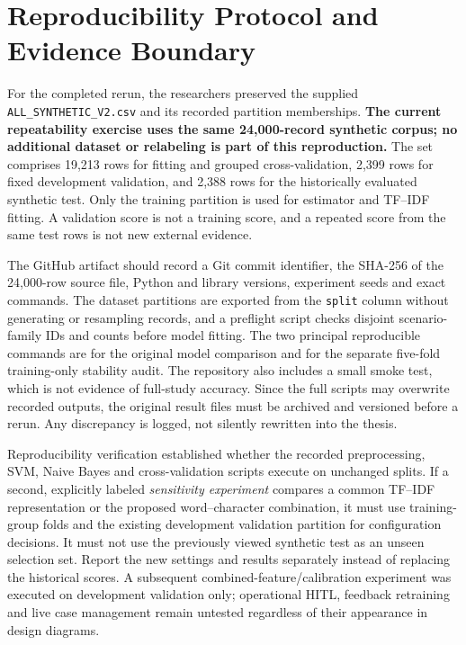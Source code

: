 \section{Reproducibility Protocol and Evidence Boundary}
\label{sec:prerun}
For the completed rerun, the researchers preserved the supplied \texttt{ALL\_SYNTHETIC\_V2.csv} and its recorded partition memberships. \textbf{The current repeatability exercise uses the same 24,000-record synthetic corpus; no additional dataset or relabeling is part of this reproduction.} The set comprises 19,213 rows for fitting and grouped cross-validation, 2,399 rows for fixed development validation, and 2,388 rows for the historically evaluated synthetic test. Only the training partition is used for estimator and TF--IDF fitting. A validation score is not a training score, and a repeated score from the same test rows is not new external evidence.

The GitHub artifact should record a Git commit identifier, the SHA-256 of the 24,000-row source file, Python and library versions, experiment seeds and exact commands. The dataset partitions are exported from the \texttt{split} column without generating or resampling records, and a preflight script checks disjoint scenario-family IDs and counts before model fitting. The two principal reproducible commands are  for the original model comparison and  for the separate five-fold training-only stability audit. The repository also includes a small smoke test, which is not evidence of full-study accuracy. Since the full scripts may overwrite recorded outputs, the original result files must be archived and versioned before a rerun. Any discrepancy is logged, not silently rewritten into the thesis.

Reproducibility verification established whether the recorded preprocessing, SVM, Naive Bayes and cross-validation scripts execute on unchanged splits. If a second, explicitly labeled \emph{sensitivity experiment} compares a common TF--IDF representation or the proposed word--character combination, it must use training-group folds and the existing development validation partition for configuration decisions. It must not use the previously viewed synthetic test as an unseen selection set. Report the new settings and results separately instead of replacing the historical scores. A subsequent combined-feature/calibration experiment was executed on development validation only; operational HITL, feedback retraining and live case management remain untested regardless of their appearance in design diagrams.

